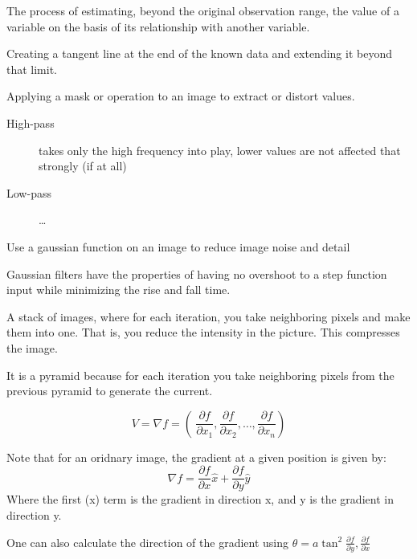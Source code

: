 \begin{definition}[extrapolation]
    The process of estimating, beyond the original observation range, the value
    of a variable on the basis of its relationship with another variable.

    Creating a tangent line at the end of the known data and extending it
    beyond that limit.

\end{definition}

\begin{definition}[Filter]
    Applying a mask or operation to an image to extract or distort values.

    \begin{description}
        \item[High-pass] takes only the high frequency into play, lower values
            are not affected that strongly (if at all)
        \item[Low-pass] \dots
    \end{description}
\end{definition}

\begin{definition}
    Use a gaussian function on an image to reduce image noise and detail
\end{definition}

\begin{definition}
    Gaussian filters have the properties of having no overshoot to a step
    function input while minimizing the rise and fall time.

\end{definition}

\begin{definition}
    A stack of images, where for each iteration, you take neighboring pixels
    and make them into one. That is, you reduce the intensity in the picture.
    This compresses the image. 

    It is a pyramid because for each iteration you take neighboring pixels
    from the previous pyramid to generate the current.
\end{definition}


\begin{definition}
    $$
        V = \nabla{f} = \left(\
        \frac{\partial{f}}{\partial{x_{1}}},
        \frac{\partial{f}}{\partial{x_{2}}},
        \dots,
        \frac{\partial{f}}{\partial{x_{n}}}
    \right)
    $$

    Note that for an oridnary image, the gradient at a given position is 
    given by:
    $$
    \nabla{f} = 
    \frac{\partial{f}}{\partial{x}}\hat{x} +
    \frac{\partial{f}}{\partial{y}}\hat{y}
    $$
    Where the first (x) term is the gradient in direction x, and y is the
    gradient in direction y.

    One can also calculate the direction of the gradient using
    $\theta = a\tan^{2}{\frac{\partial{f}}{\partial{y}}, \frac{\partial{f}}{\partial{x}}}$
\end{definition}

